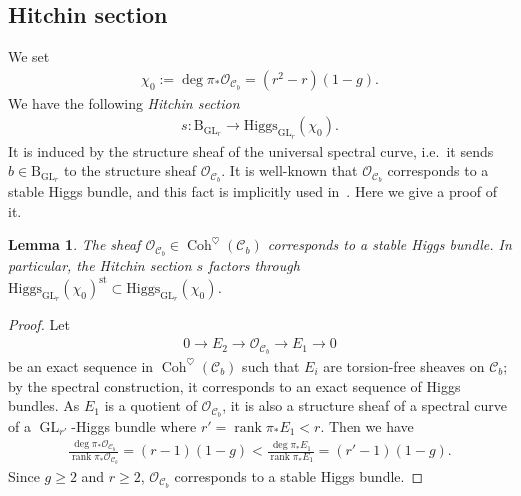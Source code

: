 \documentclass[11pt,oneside,a4paper,mathscr]{amsart}
\newtheorem{lemma}[thm]{Lemma}
\theoremstyle{definition}
\renewcommand{\geq}{\geqslant}
\newcommand{\cC}{\mathcal{C}}
\newcommand{\cO}{\mathcal{O}}
\newcommand{\rank}{\operatorname{rank}}
\newcommand{\rB}{\mathrm{B}}
\newcommand{\Coh}{\operatorname{Coh}}
\newcommand{\GL}{\operatorname{GL}}
\newcommand{\Hig}{\mathrm{Higgs}}
\begin{document}
\subsection{Hitchin section}\label{subsec:Hitsec}
We set 
\begin{align*}
    \chi_0 := \deg \pi_{*}\mathcal{O}_{\cC_b}=(r^2-r)(1-g).
\end{align*}
We have the following \textit{Hitchin section}
\begin{align}\label{sec:s}
    s \colon \rB_{\GL_r} \to \Hig_{\GL_r}(\chi_0). 
\end{align}
It is induced by the structure sheaf of the universal spectral curve, i.e.\ 
it sends $b\in \rB_{\GL_r}$ to the structure sheaf
$\mathcal{O}_{\cC_b}$. 
It is well-known that $\mathcal{O}_{\cC_b}$ corresponds to a stable 
Higgs bundle, and this fact is implicitly used in~\cite{TodaGL2}. 
Here we give a proof of it. 
\begin{lemma}\label{lem:OCstable}
The sheaf $\mathcal{O}_{\cC_b}\in \Coh^{\heartsuit}(\cC_b)$ corresponds to a stable Higgs bundle. 
In particular, the Hitchin section $s$ factors through
$\Hig_{\GL_r}(\chi_0)^{\mathrm{st}} \subset \Hig_{\GL_r}(\chi_0)$. 
\end{lemma}
\begin{proof}
    Let 
    \begin{align*}
        0\to E_2 \to \mathcal{O}_{\cC_b} \to E_1 \to 0
    \end{align*}
    be an exact sequence in $\Coh^{\heartsuit}(\cC_b)$
    such that $E_i$ are torsion-free sheaves on $\cC_b$;
    by the spectral 
    construction, it corresponds to an exact sequence of Higgs bundles. 
As $E_1$ is a quotient of $\mathcal{O}_{\cC_b}$, it is also 
    a structure sheaf of a spectral curve of a $\GL_{r'}$-Higgs bundle
    where $r'=\operatorname{rank}\pi_{*}E_1<r$. 
    Then we have 
    \begin{align*}
        \frac{\deg\pi_{*}\mathcal{O}_{\cC_b}}{\rank \pi_{*}\mathcal{O}_{\cC_b}}=(r-1)(1-g)<\frac{\deg\pi_{*}E_1}{\rank \pi_{*}E_1}=(r'-1)(1-g).
    \end{align*}
    Since $g\geq 2$ and $r\geq 2$, $\cO_{\cC_b}$ corresponds to a stable Higgs bundle. 
\end{proof}
\end{document}
